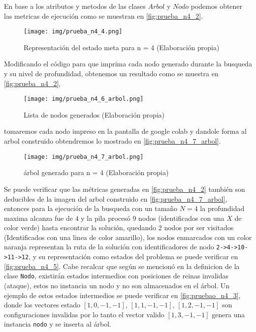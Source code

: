 \documentclass[conference]{IEEEtran}
\begin{document}
En base a los atributos y metodos de las clases $Arbol$ y $Nodo$ podemos obtener las metricas de ejecución como se muestran en \autoref{fig:prueba_n4_2}.

\begin{figure}[h]
    \centering
    \texttt{[image: img/prueba\_n4\_4.png]}
    \caption{Representación del estado meta para n = 4 (Elaboración propia)}
    \label{fig:prueba_n4_4}
\end{figure}

Modificando el código para que imprima cada nodo generado durante la busqueda y su nivel de profundidad, obtenemos un resultado como se muestra en \autoref{fig:prueba_n4_2}, 
\begin{figure}[h]
    \centering
    \texttt{[image: img/prueba\_n4\_6\_arbol.png]}
    \caption{Lista de nodos generados (Elaboración propia)}
    \label{fig:prueba_n4_6_arbol}
\end{figure}
tomaremos cada nodo impreso en la pantalla de google colab y dandole forma al arbol construido obtendremos lo mostrado en \autoref{fig:prueba_n4_7_arbol}.

  \begin{figure}[h]
    \centering
    \texttt{[image: img/prueba\_n4\_7\_arbol.png]}
    \caption{árbol generado para n = 4 (Elaboración propia)}
    \label{fig:prueba_n4_7_arbol}
\end{figure} 

Se puede verificar que las métricas generadas en \autoref{fig:prueba_n4_2} también son deducibles de la imagen del arbol construido en \autoref{fig:prueba_n4_7_arbol}, entonces para la ejecución de la busqueda con un tamaño $N=4$ la profundidad maxima alcanza fue de $4$ y la pila procesó 9 nodos (identificados con una $X$ de color verde) hasta encontrar la solución, quedando 2 nodos por ser visitados (Identificados con una linea de color amarillo), los nodos enmarcados con un color naranja representan la ruta de la solución con identificadores de nodo \texttt{2->4->10->11->12}, y su representación como estados del problema se puede verificar en \autoref{fig:prueba_n4_5}. Cabe recalcar que según se mencionó en la definicion de la clase \texttt{Nodo}, existirán estados intermedios con posiciones de reinas invalidas (ataque), estos no instancia un nodo y no son almacenados en el árbol. Un ejemplo de estos estados intermedios se puede verificar en \autoref{fig:pruebao_n4_3}, donde los vectores estado $[1,0,-1,-1]$, $[1,1,-1, -1]$, $[1,2,-1,-1]$ son configuraciones invalidas por lo tanto el vector valido $[1,3,-1,-1]$ genera una instancia \texttt{nodo} y se inserta al árbol.
\end{document}
